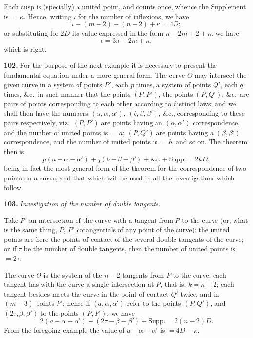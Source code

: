 \documentclass[11pt,a4paper]{article}
\theoremstyle{definition}
\begin{document}
Each cusp is (specially) a united point, and counts once, whence the Supplement is $= \kappa$. Hence, writing $\iota$ for the number of inflexions, we have
\[
\iota - (m - 2) - (n - 2) + \kappa = 4D;
\]
or substituting for $2D$ its value expressed in the form $n - 2m + 2 + \kappa$, we have
\[
\iota = 3n - 2m + \kappa,
\]
which is right.

\medskip
\noindent\textbf{102.} For the purpose of the next example it is necessary to present the fundamental equation under a more general form. The curve $\Theta$ may intersect the given curve in a system of points $P'$, each $p$ times, a system of points $Q'$, each $q$ times, \&c.\ in such manner that the points $(P, P')$, the points $(P, Q')$, \&c.\ are pairs of points corresponding to each other according to distinct laws; and we shall then have the numbers $(\alpha, \alpha, \alpha')$, $(b, \beta, \beta')$, \&c., corresponding to these pairs respectively, viz.\ $(P, P')$ are points having an $(\alpha, \alpha')$ correspondence, and the number of united points is $= a$; $(P, Q')$ are points having a $(\beta, \beta')$ correspondence, and the number of united points is $= b$, and so on. The theorem then is
\[
p(a - \alpha - \alpha') + q(b - \beta - \beta') + \&\text{c.} + \text{Supp.} = 2kD,
\]
being in fact the most general form of the theorem for the correspondence of two points on a curve, and that which will be used in all the investigations which follow.

\medskip
\noindent\textbf{103.} \textit{Investigation of the number of double tangents.}

Take $P'$ an intersection of the curve with a tangent from $P$ to the curve (or, what is the same thing, $P$, $P'$ cotangentials of any point of the curve): the united points are here the points of contact of the several double tangents of the curve; or if $\tau$ be the number of double tangents, then the number of united points is $= 2\tau$.

The curve $\Theta$ is the system of the $n - 2$ tangents from $P$ to the curve; each tangent has with the curve a single intersection at $P$, that is, $k = n - 2$; each tangent besides meets the curve in the point of contact $Q'$ twice, and in $(m - 3)$ points $P'$; hence if $(a, \alpha, \alpha')$ refer to the points $(P, Q')$, and $(2\tau, \beta, \beta')$ to the points $(P, P')$, we have
\[
2(a - \alpha - \alpha') + (2\tau - \beta - \beta') + \text{Supp.} = 2(n - 2)D.
\]
From the foregoing example the value of $a - \alpha - \alpha'$ is $= 4D - \kappa$.
\end{document}
